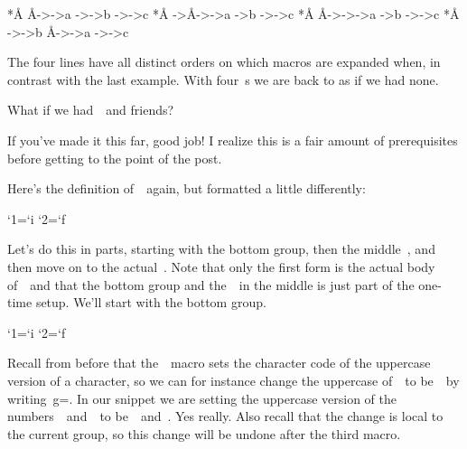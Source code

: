 {{*\AA\BB\CC
\AA ->\A   \A ->a     \BB ->\B    \B ->b   \CC ->\C   \C ->c
*\expandafter\AA\BB\CC
\BB ->\B   \AA ->\A   \A ->a      \B ->b   \CC ->\C   \C ->c
*\expandafter\expandafter\AA\BB\CC
\AA ->\A   \BB ->\B   \A ->a      \B ->b   \CC ->\C   \C ->c
*\expandafter\expandafter\expandafter\AA\BB\CC
\BB ->\B   \B ->b     \AA ->\A    \A ->a   \CC ->\C   \C ->c
\stoptyping

The four lines have all distinct orders on which macros are expanded
when, in contrast with the last example. With four~s
we are back to as if we had none.

What if we had~\type{\AAA}~and friends?

\type{\meaning\noexpand\foo}

\stopsectionlevel

\stopsectionlevel

\startsectionlevel[title={Start Actually
Expanding~\type{\newif}},reference={start-actually-expanding-newif}]

If you've made it this far, good job! I realize this is a fair amount of
prerequisites before getting to the point of the post.

Here's the definition of~\type{\newif}~again, but formatted a little
differently:

\starttyping
\outer\def\newif#1{
    \count@=\escapechar
    \escapechar=-1
    \expandafter\expandafter\expandafter \def\@if#1{true}{\let#1=\iftrue}%
    \expandafter\expandafter\expandafter \def\@if#1{false}{\let#1=\iffalse}%
    \@if#1{false} %
    \escapechar=\count@
}
\def\@if#1#2{\csname\expandafter\if@\string#1#2\endcsname}
{
    \uccode`1=`i
    \uccode`2=`f
    \uppercase{\gdef\if@12{}}
} %
\stoptyping

Let's do this in parts, starting with the bottom group, then the
middle~\type{\def}, and then move on to the actual~\type{\newif}. Note
that only the first form is the actual body of~\type{\newif}~and that
the bottom group and the~\type{\def}~in the middle is just part of the
one-time setup. We'll start with the bottom group.

\startsectionlevel[title={The Bottom
Group},reference={the-bottom-group}]

\starttyping
{
    \uccode`1=`i
    \uccode`2=`f
    \uppercase{\gdef\if@12{}}
} %
\stoptyping

Recall from before that the~\type{\uccode}~macro sets the character code
of the uppercase version of a character, so we can for instance change
the uppercase of~~to be~~by
writing~\type{\uccode}g=. In our snippet we are setting the
uppercase version of the numbers~~and~~to
be~~and~. Yes really. Also recall that the change is
local to the current group, so this change will be undone after the
third macro.

}}
